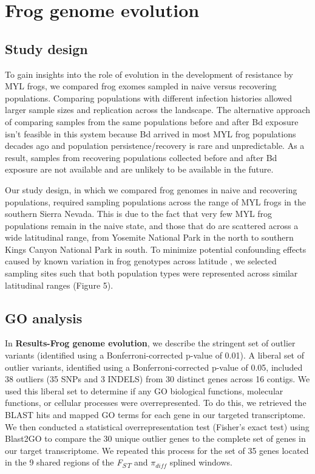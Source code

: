 \documentclass[9pt,twoside,lineno]{pnas-new-SI}
\begin{document}
\hypertarget{frog-genome-evolution-2}{%
\section{Frog genome evolution}\label{frog-genome-evolution-2}}

\hypertarget{study-design}{%
\subsection{Study design}\label{study-design}}

To gain insights into the role of evolution in the development of
resistance by MYL frogs, we compared frog exomes sampled in naive versus
recovering populations. Comparing populations with different infection
histories allowed larger sample sizes and replication across the
landscape. The alternative approach of comparing samples from the same
populations before and after Bd exposure isn't feasible in this system
because Bd arrived in most MYL frog populations decades ago and
population persistence/recovery is rare and unpredictable. As a result,
samples from recovering populations collected before and after Bd
exposure are not available and are unlikely to be available in the
future.

Our study design, in which we compared frog genomes in naive and
recovering populations, required sampling populations across the range
of MYL frogs in the southern Sierra Nevada. This is due to the fact that
very few MYL frog populations remain in the naive state, and those that
do are scattered across a wide latitudinal range, from Yosemite National
Park in the north to southern Kings Canyon National Park in south. To
minimize potential confounding effects caused by known variation in frog
genotypes across latitude \citep{byrne2023}, we selected sampling sites
such that both population types were represented across similar
latitudinal ranges (Figure 5).

\hypertarget{go-analysis}{%
\subsection{GO analysis}\label{go-analysis}}

In \textbf{Results-Frog genome evolution}, we describe the stringent set
of outlier variants (identified using a Bonferroni-corrected p-value of
0.01). A liberal set of outlier variants, identified using a
Bonferroni-corrected p-value of 0.05, included 38 outliers (35 SNPs and
3 INDELS) from 30 distinct genes across 16 contigs. We used this liberal
set to determine if any GO biological functions, molecular functions, or
cellular processes were overrepresented. To do this, we retrieved the
BLAST hits and mapped GO terms for each gene in our targeted
transcriptome. We then conducted a statistical overrepresentation test
(Fisher's exact test) using Blast2GO \citep{conesa2005} to compare the
30 unique outlier genes to the complete set of genes in our target
transcriptome. We repeated this process for the set of 35 genes located
in the 9 shared regions of the \emph{F\textsubscript{ST}} and
\(\pi_{diff}\) splined windows.
\end{document}
